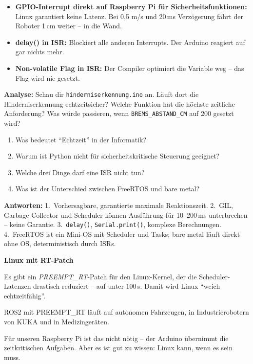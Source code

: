 \begin{fehlerBox}
\begin{itemize}
  \item \textbf{GPIO-Interrupt direkt auf Raspberry Pi für Sicherheitsfunktionen:}
        Linux garantiert keine Latenz. Bei 0,5 m/s und 20\,ms
        Verzögerung fährt der Roboter 1\,cm weiter -- in die Wand.
  \item \textbf{delay() in ISR:} Blockiert alle anderen Interrupts.
        Der Arduino reagiert auf gar nichts mehr.
  \item \textbf{Non-volatile Flag in ISR:} Der Compiler optimiert
        die Variable weg -- das Flag wird nie gesetzt.
\end{itemize}
\end{fehlerBox}

\begin{uebungBox}
\textbf{Analyse:} Schau dir \texttt{hinderniserkennung.ino} an.
Läuft dort die Hinderniserkennung echtzeitsicher?
Welche Funktion hat die höchste zeitliche Anforderung?
Was würde passieren, wenn \texttt{BREMS\_ABSTAND\_CM} auf 200 gesetzt wird?
\end{uebungBox}

\begin{quizBox}
\begin{enumerate}
  \item Was bedeutet \enquote{Echtzeit} in der Informatik?
  \item Warum ist Python nicht für sicherheitskritische Steuerung geeignet?
  \item Welche drei Dinge darf eine ISR nicht tun?
  \item Was ist der Unterschied zwischen FreeRTOS und bare metal?
\end{enumerate}
\textbf{Antworten:}
1.~Vorhersagbare, garantierte maximale Reaktionszeit.
2.~GIL, Garbage Collector und Scheduler können Ausführung für
10--200\,ms unterbrechen -- keine Garantie.
3.~\texttt{delay()}, \texttt{Serial.print()}, komplexe Berechnungen.
4.~FreeRTOS ist ein Mini-OS mit Scheduler und Tasks;
bare metal läuft direkt ohne OS, deterministisch durch ISRs.
\end{quizBox}

\begin{haubeBox}
\textbf{Linux mit RT-Patch}

Es gibt ein \textit{PREEMPT\_RT}-Patch für den Linux-Kernel,
der die Scheduler-Latenzen drastisch reduziert -- auf
unter 100\,\textmu{}s. Damit wird Linux \enquote{weich echtzeitfähig}.

ROS2 mit PREEMPT\_RT läuft auf autonomen Fahrzeugen, in
Industrierobotern von KUKA und in Medizingeräten.

Für unseren Raspberry Pi ist das nicht nötig -- der Arduino
übernimmt die zeitkritischen Aufgaben. Aber es ist gut zu
wissen: Linux kann, wenn es sein muss.
\end{haubeBox}

